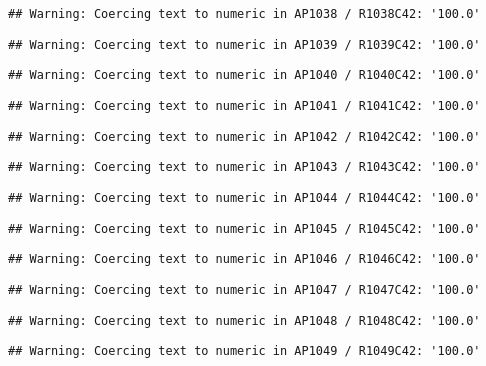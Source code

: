 \documentclass[
]{article}
\begin{document}
\begin{verbatim}
## Warning: Coercing text to numeric in AP1038 / R1038C42: '100.0'
\end{verbatim}

\begin{verbatim}
## Warning: Coercing text to numeric in AP1039 / R1039C42: '100.0'
\end{verbatim}

\begin{verbatim}
## Warning: Coercing text to numeric in AP1040 / R1040C42: '100.0'
\end{verbatim}

\begin{verbatim}
## Warning: Coercing text to numeric in AP1041 / R1041C42: '100.0'
\end{verbatim}

\begin{verbatim}
## Warning: Coercing text to numeric in AP1042 / R1042C42: '100.0'
\end{verbatim}

\begin{verbatim}
## Warning: Coercing text to numeric in AP1043 / R1043C42: '100.0'
\end{verbatim}

\begin{verbatim}
## Warning: Coercing text to numeric in AP1044 / R1044C42: '100.0'
\end{verbatim}

\begin{verbatim}
## Warning: Coercing text to numeric in AP1045 / R1045C42: '100.0'
\end{verbatim}

\begin{verbatim}
## Warning: Coercing text to numeric in AP1046 / R1046C42: '100.0'
\end{verbatim}

\begin{verbatim}
## Warning: Coercing text to numeric in AP1047 / R1047C42: '100.0'
\end{verbatim}

\begin{verbatim}
## Warning: Coercing text to numeric in AP1048 / R1048C42: '100.0'
\end{verbatim}

\begin{verbatim}
## Warning: Coercing text to numeric in AP1049 / R1049C42: '100.0'
\end{verbatim}
\end{document}
